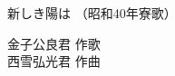 \documentclass[10pt,b5j]{tarticle} %
\begin{document}
\begin{minipage}[c]{0.7\hsize} %
    \begin{center}
        {\LARGE
            新しき陽は %
        }
        {\small 
            （昭和40年寮歌） %
        }
    \end{center}
\end{minipage}
\begin{minipage}[c]{0.3\hsize} %
    \begin{flushright} %
        金子公良君 作歌\\西雪弘光君 作曲 %
    \end{flushright}
\end{minipage}
\end{document}
